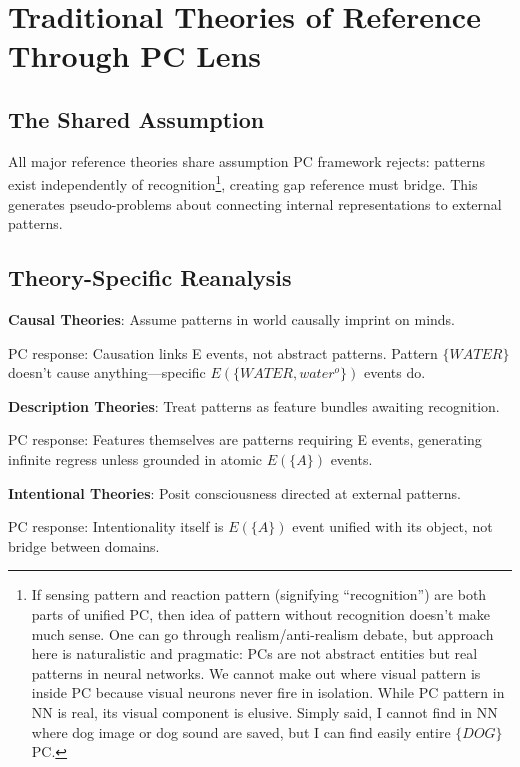 \documentclass[12pt]{article}
\begin{document}
\section{Traditional Theories of Reference Through PC Lens}\label{traditional-theories-of-reference-through-pc-lens}

\subsection{The Shared Assumption}\label{the-shared-assumption}

All major reference theories share assumption PC framework rejects: patterns exist independently of recognition\footnote{If sensing pattern and reaction pattern (signifying ``recognition'') are both parts of unified PC, then idea of pattern without recognition doesn't make much sense. One can go through realism/anti-realism debate, but approach here is naturalistic and pragmatic: PCs are not abstract entities but real patterns in neural networks. We cannot make out where visual pattern is inside PC because visual neurons never fire in isolation. While PC pattern in NN is real, its visual component is elusive. Simply said, I cannot find in NN where dog image or dog sound are saved, but I can find easily entire \(\{DOG\}\) PC.}, creating gap reference must bridge. This generates pseudo-problems about connecting internal representations to external patterns.

\subsection{Theory-Specific Reanalysis}\label{theory-specific-reanalysis}

\textbf{Causal Theories}: Assume patterns in world causally imprint on minds.

PC response: Causation links E events, not abstract patterns. Pattern \(\{WATER\}\) doesn't cause anything---specific \(E(\{WATER, water^o\})\) events do.

\textbf{Description Theories}: Treat patterns as feature bundles awaiting recognition.

PC response: Features themselves are patterns requiring E events, generating infinite regress unless grounded in atomic \(E(\{A\})\) events.

\textbf{Intentional Theories}: Posit consciousness directed at external patterns.

PC response: Intentionality itself is \(E(\{A\})\) event unified with its object, not bridge between domains.
\end{document}
